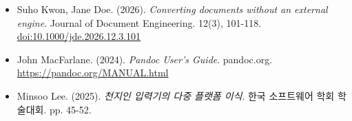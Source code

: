 \documentclass[11pt]{article}
\date{}
\begin{document}
\begin{itemize}
\item Suho Kwon, Jane Doe. (2026). \emph{Converting documents without an
external engine}. Journal of Document Engineering. 12(3), 101-118.
\href{https://doi.org/10.1000/jde.2026.12.3.101}{doi:10.1000/jde.2026.12.3.101}
\item John MacFarlane. (2024). \emph{Pandoc User's Guide}. pandoc.org.
\url{https://pandoc.org/MANUAL.html}
\item Minsoo Lee. (2025). \emph{천지인 입력기의 다중 플랫폼 이식}. 한국 소프트웨어 학회 학술대회. pp.
45-52.
\end{itemize}
\end{document}
